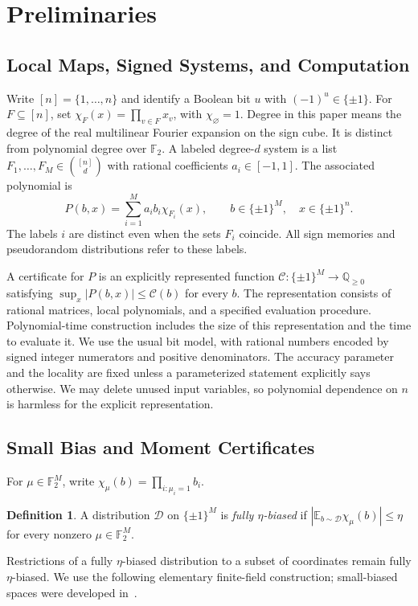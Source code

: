 \documentclass[letterpaper,11pt]{article}
\theoremstyle{definition}
\newtheorem{definition}[theorem]{Definition}
\newcommand{\F}{\mathbb F}
\newcommand{\Q}{\mathbb Q}
\newcommand{\E}{\mathbb E}
\begin{document}
\section{Preliminaries}
\label{sec:preliminaries}

\subsection{Local Maps, Signed Systems, and Computation}
Write $[n]=\{1,\ldots,n\}$ and identify a Boolean bit $u$ with
$(-1)^u\in\{\pm1\}$. For $F\subseteq[n]$, set
$\chi_F(x)=\prod_{v\in F}x_v$, with $\chi_\varnothing=1$.
Degree in this paper means the degree of the real multilinear Fourier
expansion on the sign cube. It is distinct from polynomial degree
over $\F_2$. A labeled degree-$d$ system is a list
$F_1,\ldots,F_M\in\binom{[n]}d$ with rational coefficients
$a_i\in[-1,1]$. The associated polynomial is
\[
 P(b,x)=\sum_{i=1}^M a_i b_i\chi_{F_i}(x),
 \qquad b\in\{\pm1\}^M,\quad x\in\{\pm1\}^n.
\]
The labels $i$ are distinct even when the sets $F_i$ coincide.
All sign memories and pseudorandom distributions refer to these labels.

A certificate for $P$ is an explicitly represented function
$\mathcal C:\{\pm1\}^M\to\Q_{\ge0}$ satisfying
$\sup_x|P(b,x)|\le\mathcal C(b)$ for every $b$.
The representation consists of rational matrices, local polynomials,
and a specified evaluation procedure. Polynomial-time construction
includes the size of this representation and the time to evaluate it.
We use the usual bit model, with rational numbers encoded by signed
integer numerators and positive denominators. The accuracy parameter
and the locality are fixed unless a parameterized statement explicitly
says otherwise. We may delete unused input variables, so polynomial
dependence on $n$ is harmless for the explicit representation.

\subsection{Small Bias and Moment Certificates}
For $\mu\in\F_2^M$, write
$\chi_\mu(b)=\prod_{i:\mu_i=1}b_i$.

\begin{definition}
A distribution $\mathcal D$ on $\{\pm1\}^M$ is
\emph{fully $\eta$-biased} if
$|\E_{b\sim\mathcal D}\chi_\mu(b)|\le\eta$ for every nonzero
$\mu\in\F_2^M$.
\end{definition}

Restrictions of a fully $\eta$-biased distribution to a subset of
coordinates remain fully $\eta$-biased. We use the following elementary
finite-field construction; small-biased spaces were developed
in~\cite{NN93,AGHP92}.
\end{document}
